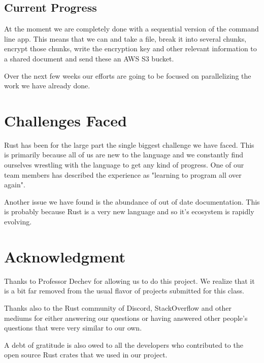 \documentclass[conference]{IEEEtran}
\begin{document}
\subsection{Current Progress}

At the moment we are completely done with a sequential version of the command line app.
This means that we can and take a file, break it into several chunks, encrypt those chunks,
write the encryption key and other relevant information to a shared document and send these
an AWS S3 bucket.

Over the next few weeks our efforts are going to be focused on parallelizing the work we have
already done.

\section{Challenges Faced}

Rust has been for the large part the single biggest challenge we have faced.
This is primarily because all of us are new to the language and we constantly find ourselves
wrestling with the language to get any kind of progress.
One of our team members has described the experience as "learning to program all over again".

Another issue we have found is the abundance of out of date documentation.
This is probably because Rust is a very new language and so it's ecosystem is rapidly evolving.

\section*{Acknowledgment}

Thanks to Professor Dechev for allowing us to do this project.
We realize that it is a bit far removed from the usual flavor
of projects submitted for this class.

Thanks also to the Rust community of Discord, StackOverflow
and other mediums for either answering our questions or having
answered other people's questions that were very similar to our own.

A debt of gratitude is also owed to all the developers who contributed
to the open source Rust crates that we used in our project.

\end{document}
